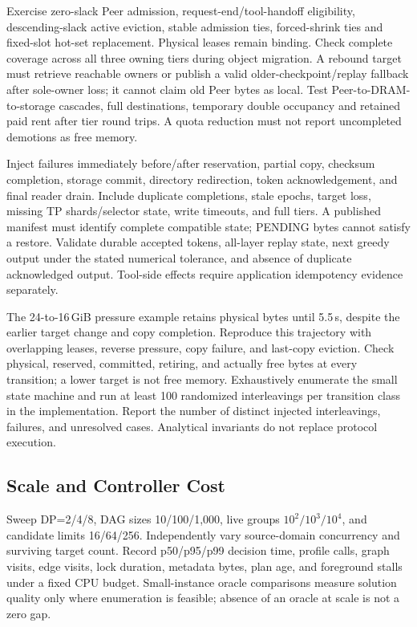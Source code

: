 \documentclass[sigplan,10pt,anonymous,nonacm]{acmart}
\begin{document}
Exercise zero-slack Peer admission, request-end/tool-handoff eligibility,
descending-slack active eviction, stable admission ties, forced-shrink
ties and fixed-slot hot-set replacement. Physical leases remain binding.
Check complete coverage across all three owning tiers during object
migration. A rebound target must retrieve reachable owners or publish a
valid older-checkpoint/replay fallback after sole-owner loss; it cannot
claim old Peer bytes as local. Test Peer-to-DRAM-to-storage cascades, full
destinations, temporary double occupancy and retained paid rent after
tier round trips. A quota reduction must not report uncompleted demotions
as free memory.

Inject failures immediately before/after reservation, partial copy,
checksum completion, storage commit, directory redirection, token
acknowledgement, and final reader drain. Include duplicate completions,
stale epochs, target loss, missing TP shards/selector state, write timeouts,
and full tiers. A published manifest must identify complete compatible
state; PENDING bytes cannot satisfy a restore. Validate durable accepted
tokens, all-layer replay state, next greedy output under the stated
numerical tolerance, and absence of duplicate acknowledged output.
Tool-side effects require application idempotency evidence separately.

The 24-to-16\,GiB pressure example retains physical bytes until 5.5\,s,
despite the earlier target change and copy completion. Reproduce this
trajectory with overlapping leases, reverse pressure, copy failure,
and last-copy eviction. Check physical, reserved, committed, retiring,
and actually free bytes at every transition; a lower target is not free
memory. Exhaustively enumerate the small state machine and run at least
100 randomized interleavings per transition class in the implementation.
Report the number of distinct injected interleavings, failures, and
unresolved cases. Analytical invariants do not replace protocol execution.

\FloatBarrier
\subsection{Scale and Controller Cost}

Sweep DP=2/4/8, DAG sizes 10/100/1,000, live groups
$10^2/10^3/10^4$, and candidate limits 16/64/256. Independently vary
source-domain concurrency and surviving target count. Record p50/p95/p99
decision time, profile calls, graph visits, edge visits, lock duration,
metadata bytes, plan age, and foreground stalls under a fixed CPU budget.
Small-instance oracle comparisons measure solution quality only where
enumeration is feasible; absence of an oracle at scale is not a zero gap.
\end{document}
